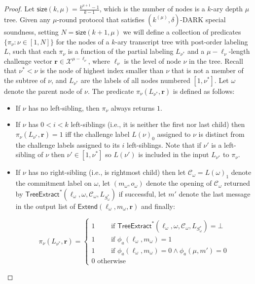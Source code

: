 \begin{proof}
Let $\textsf{size}(k, \mu) = \frac{k^{\mu+1}-1}{k-1}$, which is the number of nodes is a $k$-ary depth $\mu$ tree. Given any $\mu$-round protocol that satisfies $(k^{(\mu)}, \delta)$-DARK special soundness, setting $N = \textsf{size}(k+1, \mu)$ we will define a collection of predicates $\{\pi_\nu: \nu \in [1,N]\}$ for the nodes of a $k$-ary transcript tree with post-order labeling $L$, such that each $\pi_\nu$ is a function of the partial labeling $L_{\nu^*}$ and a $\mu - \ell_\nu$-length challenge vector $\mathbf{r} \in \mathcal{X}^{\mu - \ell_\nu}$, where $\ell_\nu$ is the level of node $\nu$ in the tree. Recall that $\nu^* < \nu$ is the node of highest index smaller than $\nu$ that is not a member of the subtree of $\nu$, and $L_{\nu^*}$ are the labels of all nodes numbered $[1, \nu^*]$. Let $\omega$ denote the parent node of $\nu$. The predicate $\pi_\nu(L_{\nu^*}, \mathbf{r})$ is defined as follows: 
\begin{itemize} 
\item If $\nu$ has no left-sibling, then $\pi_\nu$ always returns $1$. 
\item If $\nu$ has $0 < i < k$ left-siblings (i.e., it is neither the first nor last child) then $\pi_\nu(L_{\nu^*}, \mathbf{r}) = 1$ iff the challenge label $L(\nu)_0$ assigned to $\nu$ is distinct from the challenge labels assigned to its $i$ left-siblings. Note that if $\nu'$ is a left-sibling of $\nu$ then $\nu' \in [1, \nu^*]$ so $L(\nu')$ is included in the input $L_{\nu^*}$ to $\pi_\nu$. 
\item If $\nu$ has no right-sibling (i.e., is rightmost child) then let $\mathcal{C}_\omega = L(\omega)_1$ denote the commitment label on $\omega$, let $(m_\omega, o_\omega)$ denote the opening of $\mathcal{C}_\omega$ returned by $\textsf{TreeExtract}^*(\ell_\omega, \omega, \mathcal{C}_\omega, L_{S^*_\omega})$ if successful, let $m'$ denote the last message in the output list of $\textsf{Extend}(\ell_\omega, m_\omega,\mathbf{r})$ and finally: 

 $$\pi_\nu(L_{\nu^*}, \mathbf{r}) = 
 \begin{cases} 1 \quad\quad \text{ if }  \textsf{TreeExtract}^*(\ell_\omega, \omega, \mathcal{C}_\omega, L_{S^*_\omega}) = \bot \\ 
 1 \quad \quad \text{ if } \phi_a(\ell_\omega, m_\omega) = 1\\
 1 \quad \quad \text{ if } \phi_a(\ell_\omega, m_\omega) = 0 \wedge \phi_a(\mu, m') = 0 \\ 
0\text{ otherwise} 
\end{cases} $$ 



\end{itemize}
\end{proof}
